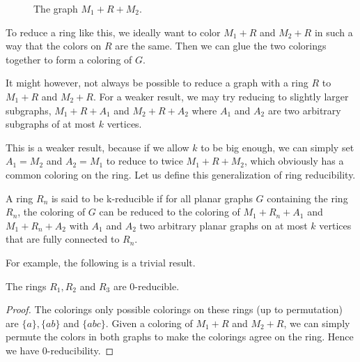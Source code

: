 \begin{figure}[!ht]
    \centering
    \caption{The graph $M_1 + R + M_2$.}
\end{figure}

To reduce a ring like this, we ideally want to color $M_1+R$ and $M_2+R$ in such a way that the colors on $R$ are the same. Then we can glue the two colorings together to form a coloring of $G$.

It might however, not always be possible to reduce a graph with a ring $R$ to $M_1+R$ and $M_2+R$. For a weaker result, we may try reducing to slightly larger subgraphs, $M_1+R+A_1$ and $M_2+R+A_2$ where $A_1$ and $A_2$ are two arbitrary subgraphs of at most $k$ vertices. 

This is a weaker result, because if we allow $k$ to be big enough, we can simply set $A_1 = M_2$ and $A_2 = M_1$ to reduce to twice $M_1 + R + M_2$, which obviously has a common coloring on the ring. Let us define this generalization of ring reducibility.

\begin{definition}
    A ring $R_n$ is said to be k-reducible if for all planar graphs $G$ containing the ring $R_n$, the coloring of $G$ can be reduced to the coloring of $M_1+R_n+A_1$ and $M_1+R_n+A_2$ with $A_1$ and $A_2$ two arbitrary planar graphs on at most $k$ vertices that are fully connected to $R_n$.
\end{definition}

For example, the following is a trivial result.

\begin{example}
    The rings $R_1, R_2$ and $R_3$ are 0-reducible.
\end{example}

\begin{proof}
    The colorings only possible colorings on these rings (up to permutation) are $\{ a \}, \{ ab \}$ and $\{ abc \}$. Given a coloring of $M_1+R$ and $M_2+R$, we can simply permute the colors in both graphs to make the colorings agree on the ring. Hence we have 0-reducibility.
\end{proof}

